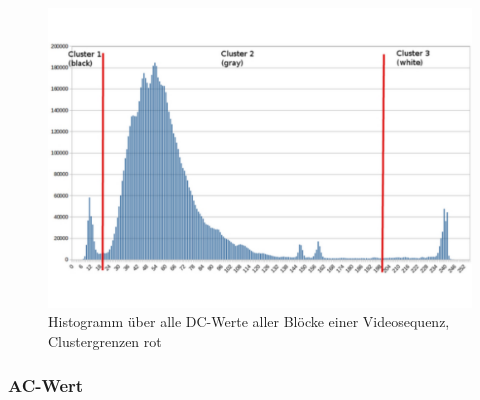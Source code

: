 \begin{figure}[H]
	\centering
	\includegraphics[trim=0cm 3cm 0cm 3cm, clip=true,width=1\textwidth]{bilder/04_histogram_cluster.pdf}
	\caption{Histogramm über alle DC-Werte aller Blöcke einer Videosequenz, Clustergrenzen rot}
	\label{fig:histogram}
\end{figure}

\subsubsection{AC-Wert}
\label{sec:ac-wert}

